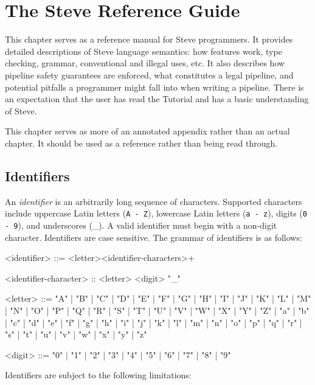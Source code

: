 \chapter{The Steve Reference Guide} \label{ch:users_guide}

This chapter serves as a reference manual for Steve programmers. It provides detailed descriptions of Steve language semantics: how features work, type checking, grammar, conventional and illegal uses, etc. It also describes how pipeline safety guarantees are enforced, what constitutes a legal pipeline, and potential pitfalls a programmer might fall into when writing a pipeline.
There is an expectation that the user has read the Tutorial and has a basic understanding of Steve.

This chapter serves as more of an annotated appendix rather than an actual chapter. It should be used as a reference rather than being read
through. 

\section{Identifiers} \label{guide:identifiers}

An \textit{identifier} is an arbitrarily long sequence of characters. Supported characters include uppercase Latin letters (\texttt{A - Z}), lowercase Latin letters (\texttt{a - z}), digits (\texttt{0 - 9}), and underscores (\_). A valid identifier must begin with a non-digit character. Identifiers are case sensitive. The grammar of identifiers is as follows:

\begin{minip}
\begin{grammar}
<identifier> ::= <letter><identifier-characters>+

<identifier-character> :: <letter>
\alt <digit>
\alt "_"

<letter> ::= "A" | "B" | "C" | "D" | "E" | "F" | "G"
       | "H" | "I" | "J" | "K" | "L" | "M" | "N"
       | "O" | "P" | "Q" | "R" | "S" | "T" | "U"
       | "V" | "W" | "X" | "Y" | "Z" | "a" | "b"
       | "c" | "d" | "e" | "f" | "g" | "h" | "i"
       | "j" | "k" | "l" | "m" | "n" | "o" | "p"
       | "q" | "r" | "s" | "t" | "u" | "v" | "w"
       | "x" | "y" | "z"

<digit> ::= "0" | "1" | "2" | "3" | "4" | "5" | "6" | "7" | "8" | "9"
\end{grammar}
\end{minip}

Identifiers are subject to the following limitations:

